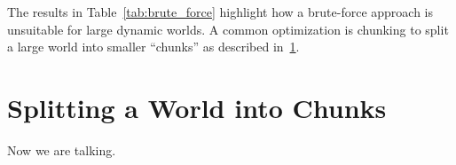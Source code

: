 The results in Table~\ref{tab:brute_force} highlight how a brute-force approach is unsuitable for large dynamic worlds.
A common optimization is chunking to split a large world into smaller ``chunks'' as described in~\ref{sec:chunking}.

\section{Splitting a World into Chunks} \label{sec:chunking}
Now we are talking.
